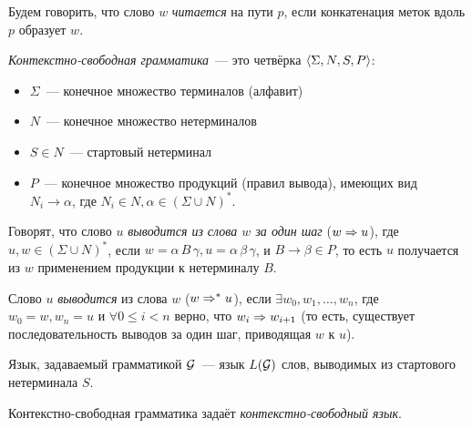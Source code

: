 \begin{definition}
  Будем говорить, что слово $w$ \textit{читается} на пути $p$, если конкатенация меток вдоль $p$ образует $w$. 
\end{definition}

\begin{definition}
  \textit{Контекстно-свободная грамматика}~--- это четвёрка $\langle \Sigma, N, S, P \rangle$:
  \vspace{-\topsep}
  \begin{itemize}
    \setlength\itemsep{-0.1em}
    \item $\Sigma$~--- конечное множество терминалов (алфавит)
    \item $N$~--- конечное множество нетерминалов
    \item $S \in N$~--- стартовый нетерминал
    \item $P$~--- конечное множество продукций (правил вывода), имеющих вид\\ $N_i \to \alpha$, где $N_i \in N, \alpha \in (\Sigma \cup N)^{*}$.
  \end{itemize}

  Говорят, что слово $u$ \textit{выводится из слова $w$ за один шаг} ($w \Rightarrow u$), где $u, w \in (\Sigma \cup N)^{*}$, если $w = \alpha\, B \,\gamma, u = \alpha \, \beta \, \gamma$, и $B \to \beta \in P$, то есть $u$ получается из $w$ применением продукции к нетерминалу $B$.

  Слово $u$ \textit{выводится} из слова $w$ ($w \Rightarrow^{*} u$), если $\exists w_0, w_1, \dots , w_n $, где $w_0 = w, w_n = u$ и $\forall 0 \le i < n$ верно, что $w_i \Rightarrow w_{i+1}$ (то есть, существует последовательность выводов за один шаг, приводящая $w$ к $u$).

  Язык, задаваемый грамматикой $\mathcal{G}$~--- язык $L(\mathcal{G})$ слов, выводимых из стартового нетерминала $S$.

  Контекстно-свободная грамматика задаёт \textit{контекстно-свободный язык}.
\end{definition}

